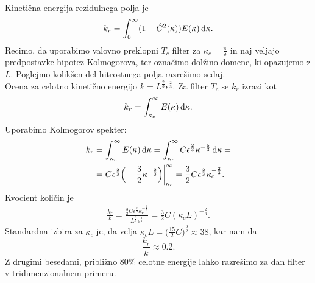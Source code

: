 \documentclass[mat2, tisk]{fmfdelo}
\begin{document}
\begin{primer}
Kinetična energija rezidulnega polja je 
$$
k_r = \int_{0}^{\infty} (1 - \hat{G}^2(\kappa)) E(\kappa) \dif \kappa.
$$
Recimo, da uporabimo valovno preklopni $T_c$ filter za $\kappa_c = \frac{\pi}{\delta}$ in naj veljajo
predpostavke hipotez Kolmogorova, ter označimo dolžino domene, ki opazujemo z $L$. 
Poglejmo kolikšen del hitrostnega polja razrešimo sedaj. \\

Ocena za celotno kinetično energijo $k = L^\frac{2}{3} \epsilon^\frac{2}{3}$. 
Za filter $T_c$ se $k_r$ izrazi kot 
$$
k_r = \int_{\kappa_c}^{\infty} E(\kappa) \dif \kappa. 
$$
Uporabimo Kolmogorov spekter: 
\begin{align*}
k_r &= \int_{\kappa_c}^{\infty} E(\kappa) \dif \kappa = \int_{\kappa_c}^{\infty} C \epsilon^{\frac{2}{3}} \kappa^{-\frac{5}{3}} \dif \kappa = \\
&= C \epsilon^{\frac{2}{3}} \Big(- \frac{3}{2} \kappa^{-\frac{2}{3}}\Big)\Big|_{\kappa_c}^\infty = \frac{3}{2} C \epsilon^{\frac{2}{3}}\kappa_c^{-\frac{2}{3}}.
\end{align*}
Kvocient količin je 
\begin{align*}
\frac{k_r}{k} = \frac{\frac{3}{2} C \epsilon^{\frac{2}{3}}\kappa_c^{-\frac{2}{3}}}{L^\frac{2}{3} \epsilon^\frac{2}{3}} = 
\frac{3}{2}C (\kappa_c L)^{-\frac{2}{3}}.
\end{align*}
Standardna izbira za $\kappa_c$ je, da velja $\kappa_c L = \Big(\frac{15}{2}C\Big)^\frac{3}{2} \approx 38$, 
kar nam da 
$$
\frac{k_r}{k} \approx 0.2.
$$
Z drugimi besedami, približno $80\%$ celotne energije lahko razrešimo 
za dan filter v tridimenzionalnem primeru.
\end{primer}

\newpage
\end{document}
